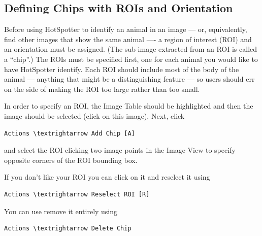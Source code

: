 \documentclass[a4paper,10pt]{article}
\begin{document}
    \subsection{Defining Chips with ROIs and Orientation}
        Before using HotSpotter to identify an animal in an image ---
        or, equivalently, find other images that show the same
        animal ---- a region of interest (ROI) and an orientation must
        be assigned.  (The sub-image extracted from an ROI is called a
        ``chip''.)  The ROIs must be specified first, one for each
        animal you would like to have HotSpotter identify.
%
        Each ROI should include most of the body of the animal ---
        anything that might be a distinguishing feature --- so users should err on the
        side of making the ROI too large rather than too small.

        In order to specify an ROI, the Image Table should be
        highlighted and then the image should be selected (click on
        this image).  Next, click
        \begin{Verbatim}[commandchars=\\\{\}]
        Actions \textrightarrow Add Chip [A]
        \end{Verbatim}
        and select the  ROI clicking two image points in the Image
        View to specify opposite corners of the ROI bounding box.

        \;

        If you don't like your ROI you can click on it and reselect it
        using
        \begin{Verbatim}[commandchars=\\\{\}]
        Actions \textrightarrow Reselect ROI [R]
        \end{Verbatim}
        You can use remove it entirely using 
        \begin{Verbatim}[commandchars=\\\{\}]
        Actions \textrightarrow Delete Chip
        \end{Verbatim}
\end{document}
